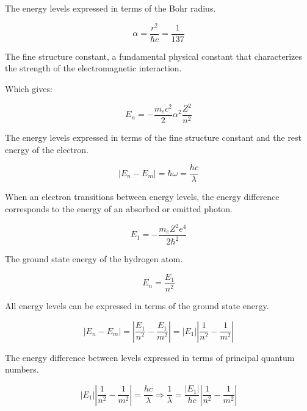 \documentclass[italian]{HKNdocument}
\begin{document}
The energy levels expressed in terms of the Bohr radius.

\begin{equation}
\alpha=\frac{r^{2}}{\hbar c}=\frac{1}{137} \label{eq:9.87}
\end{equation}

The fine structure constant, a fundamental physical constant that characterizes the strength of the electromagnetic interaction.

Which gives:

\begin{equation}
E_{n}=-\frac{m_{e} c^{2}}{2} \alpha^{2} \frac{Z^{2}}{n^{2}} \label{eq:9.88}
\end{equation}

The energy levels expressed in terms of the fine structure constant and the rest energy of the electron.

\begin{equation}
\left|E_{n}-E_{m}\right|=\hbar \omega=\frac{h c}{\lambda} \label{eq:9.89}
\end{equation}

When an electron transitions between energy levels, the energy difference corresponds to the energy of an absorbed or emitted photon.

\begin{equation}
E_{1}=-\frac{m_{e} Z^{2} e^{4}}{2 \hbar^{2}} \label{eq:9.90}
\end{equation}

The ground state energy of the hydrogen atom.

\begin{equation}
E_{n}=\frac{E_{1}}{n^{2}} \label{eq:9.91}
\end{equation}

All energy levels can be expressed in terms of the ground state energy.

\begin{equation}
\left|E_{n}-E_{m}\right|=\left|\frac{E_{1}}{n^{2}}-\frac{E_{1}}{m^{2}}\right|=\left|E_{1}\right|\left|\frac{1}{n^{2}}-\frac{1}{m^{2}}\right| \label{eq:9.92}
\end{equation}

The energy difference between levels expressed in terms of principal quantum numbers.

\begin{equation}
\left|E_{1}\right|\left|\frac{1}{n^{2}}-\frac{1}{m^{2}}\right|=\frac{h c}{\lambda} \Longrightarrow \frac{1}{\lambda}=\frac{\left|E_{1}\right|}{h c}\left|\frac{1}{n^{2}}-\frac{1}{m^{2}}\right| \label{eq:9.93}
\end{equation}
\end{document}
